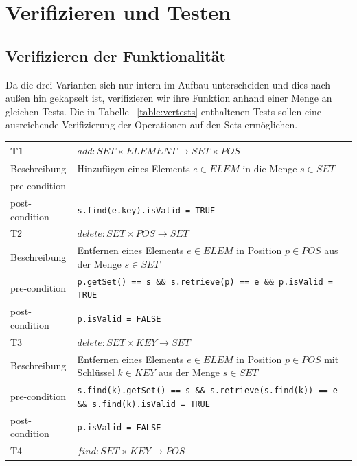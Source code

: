 \documentclass[11pt]{scrartcl}
\begin{document}
\section{Verifizieren und Testen}
\label{sec:vertests}

\subsection{Verifizieren der Funktionalität}
\label{sec:verfun}
Da die drei Varianten sich nur intern im Aufbau unterscheiden und dies nach außen hin gekapselt ist, verifizieren wir ihre Funktion anhand einer Menge an gleichen Tests.
Die in Tabelle ~\ref{table:vertests} enthaltenen Tests sollen eine ausreichende Verifizierung der Operationen auf den Sets ermöglichen.

\begin{table}
\begin{tabular}[ht]{|l|p{12cm}|}
\hline
T1             & \(add : SET \times ELEMENT \to SET \times POS\) \\ \hline
Beschreibung  & Hinzufügen eines Elements \(e \in ELEM\) in die Menge \(s \in SET\)           \\ \hline
pre-condition  & -           \\ \hline
post-condition & \texttt{s.find(e.key).isValid = TRUE}           \\ \hline
\hline
T2             & \(delete : SET \times POS \to SET\) \\ \hline
Beschreibung  & Entfernen eines Elements \(e \in ELEM\) in Position \(p \in POS\) aus der Menge \(s \in SET\)           \\ \hline
pre-condition  & \texttt{p.getSet() == s \&\& s.retrieve(p) == e \&\& p.isValid = TRUE}            \\ \hline
post-condition & \texttt{p.isValid = FALSE}           \\ \hline
\hline
T3             & \(delete : SET \times KEY \to SET\) \\ \hline
Beschreibung  & Entfernen eines Elements \(e \in ELEM\) in Position \(p \in POS\) mit Schlüssel \(k \in KEY\) aus der Menge \(s \in SET\)           \\ \hline
pre-condition  & \texttt{s.find(k).getSet() == s \&\& s.retrieve(s.find(k)) == e \&\& s.find(k).isValid = TRUE}            \\ \hline
post-condition & \texttt{p.isValid = FALSE}           \\ \hline
\hline
T4             & \(find : SET \times KEY \to POS\) \\ \hline

\end{tabular}
\end{table}
\end{document}
